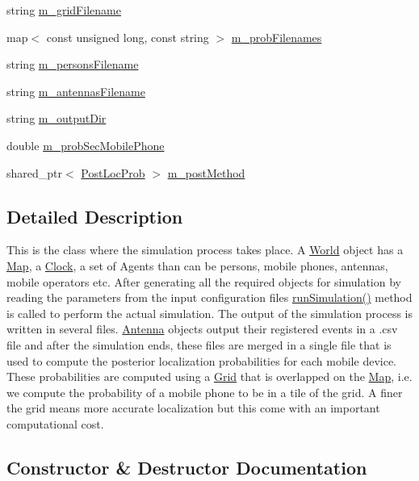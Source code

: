 \begin{DoxyCompactItemize}
\item 
string \hyperlink{class_world_a91e15a41a1a885770916c6b560883d5f}{m\+\_\+grid\+Filename}
\item 
map$<$ const unsigned long, const string $>$ \hyperlink{class_world_afec4433aef7c6e667c669b83a62695ea}{m\+\_\+prob\+Filenames}
\item 
string \hyperlink{class_world_a66e68ec2220ea27e705aac88a920b6fd}{m\+\_\+persons\+Filename}
\item 
string \hyperlink{class_world_ac38e4d56d6bcabc35cf0e6763892a7a2}{m\+\_\+antennas\+Filename}
\item 
string \hyperlink{class_world_a7e32421ab881331c06802e7719557e48}{m\+\_\+output\+Dir}
\item 
double \hyperlink{class_world_a45e13597d542b7f2eb0b0d77e1a8633f}{m\+\_\+prob\+Sec\+Mobile\+Phone}
\item 
shared\+\_\+ptr$<$ \hyperlink{class_post_loc_prob}{Post\+Loc\+Prob} $>$ \hyperlink{class_world_a434bcb4c18cc7b3194d1ea6c09b76284}{m\+\_\+post\+Method}
\end{DoxyCompactItemize}


\subsection{Detailed Description}
This is the class where the simulation process takes place. A \hyperlink{class_world}{World} object has a \hyperlink{class_map}{Map}, a \hyperlink{class_clock}{Clock}, a set of Agents than can be persons, mobile phones, antennas, mobile operators etc. After generating all the required objects for simulation by reading the parameters from the input configuration files \hyperlink{class_world_aa825a43f968c8fe750c67156e64721ff}{run\+Simulation()} method is called to perform the actual simulation. The output of the simulation process is written in several files. \hyperlink{class_antenna}{Antenna} objects output their registered events in a .csv file and after the simulation ends, these files are merged in a single file that is used to compute the posterior localization probabilities for each mobile device. These probabilities are computed using a \hyperlink{class_grid}{Grid} that is overlapped on the \hyperlink{class_map}{Map}, i.\+e. we compute the probability of a mobile phone to be in a tile of the grid. A finer the grid means more accurate localization but this come with an important computational cost. 

\subsection{Constructor \& Destructor Documentation}
\mbox{\label{class_world_a94871f094bb3eabb67f5bd1b10396832}} 
